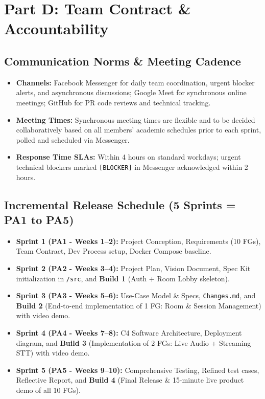 \documentclass[11pt,a4paper]{article}
\begin{document}
\newpage

\section{Part D: Team Contract \& Accountability}
\subsection{Communication Norms \& Meeting Cadence}
\begin{itemize}[leftmargin=1.2cm]
    \item \textbf{Channels:} Facebook Messenger for daily team coordination, urgent blocker alerts, and asynchronous discussions; Google Meet for synchronous online meetings; GitHub for PR code reviews and technical tracking.
    \item \textbf{Meeting Times:} Synchronous meeting times are flexible and to be decided collaboratively based on all members' academic schedules prior to each sprint, polled and scheduled via Messenger.
    \item \textbf{Response Time SLAs:} Within 4 hours on standard workdays; urgent technical blockers marked \texttt{[BLOCKER]} in Messenger acknowledged within 2 hours.
\end{itemize}

\subsection{Incremental Release Schedule (5 Sprints = PA1 to PA5)}
\begin{itemize}[leftmargin=1.2cm]
    \item \textbf{Sprint 1 (PA1 - Weeks 1--2):} Project Conception, Requirements (10 FGs), Team Contract, Dev Process setup, Docker Compose baseline.
    \item \textbf{Sprint 2 (PA2 - Weeks 3--4):} Project Plan, Vision Document, Spec Kit initialization in \texttt{/src}, and \textbf{Build 1} (Auth + Room Lobby skeleton).
    \item \textbf{Sprint 3 (PA3 - Weeks 5--6):} Use-Case Model \& Specs, \texttt{Changes.md}, and \textbf{Build 2} (End-to-end implementation of 1 FG: Room \& Session Management) with video demo.
    \item \textbf{Sprint 4 (PA4 - Weeks 7--8):} C4 Software Architecture, Deployment diagram, and \textbf{Build 3} (Implementation of 2 FGs: Live Audio + Streaming STT) with video demo.
    \item \textbf{Sprint 5 (PA5 - Weeks 9--10):} Comprehensive Testing, Refined test cases, Reflective Report, and \textbf{Build 4} (Final Release \& 15-minute live product demo of all 10 FGs).
\end{itemize}
\end{document}

